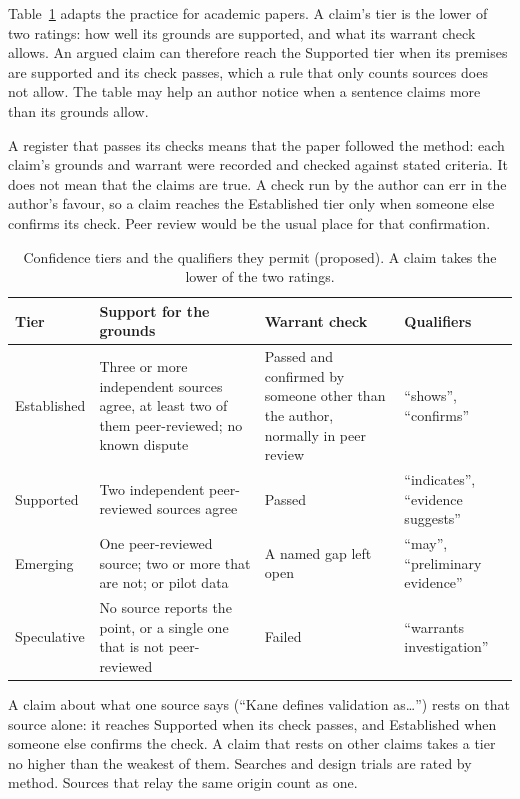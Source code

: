 \documentclass[12pt, a4paper]{article}
\begin{document}
Table~\ref{tab:confidence} adapts the
practice for academic papers.  A claim's tier is the lower of two
ratings: how well its grounds are supported, and what its warrant check
allows.  An argued claim can therefore reach the Supported tier when its
premises are supported and its check passes, which a rule that only
counts sources does not allow.  The table may help an author notice
when a sentence claims more than its grounds allow.

A register that passes its checks means that the paper followed the
method: each claim's grounds and warrant were recorded and checked
against stated criteria.  It does not mean that the claims are true.  A
check run by the author can err in the author's favour, so a claim
reaches the Established tier only when someone else confirms its check.
Peer review would be the usual place for that confirmation.

\begin{table}[htbp]
\centering
\caption{Confidence tiers and the qualifiers they permit (proposed).  A
claim takes the lower of the two ratings.}
\label{tab:confidence}
\footnotesize
\begin{tabular}{@{}p{2cm}p{4.9cm}p{4.2cm}p{3.2cm}@{}}
\toprule
\textbf{Tier} & \textbf{Support for the grounds} & \textbf{Warrant check} & \textbf{Qualifiers} \\
\midrule
Established & Three or more independent sources agree, at least two of them peer-reviewed; no known dispute & Passed and confirmed by someone other than the author, normally in peer review & ``shows'', ``confirms'' \\
Supported   & Two independent peer-reviewed sources agree & Passed & ``indicates'', ``evidence suggests'' \\
Emerging    & One peer-reviewed source; two or more that are not; or pilot data & A named gap left open & ``may'', ``preliminary evidence'' \\
Speculative & No source reports the point, or a single one that is not peer-reviewed & Failed & ``warrants investigation'' \\
\bottomrule
\end{tabular}

\smallskip\raggedright A claim about what one source says (``Kane
defines validation as\ldots'') rests on that source alone: it reaches Supported when its check
passes, and Established when someone else confirms the check.  A claim
that rests on other claims takes a tier no higher than the weakest of
them.  Searches and design trials are rated by method.  Sources that relay the same origin count as one.
\end{table}
\end{document}
